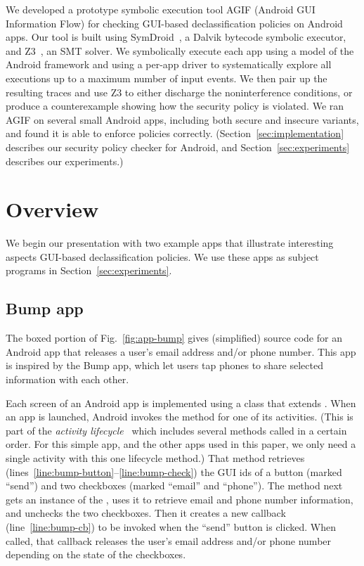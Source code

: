 \documentclass{entcs} \usepackage{entcsmacro}
\newcommand{\code}[1]{\text{\lstinline!#1!}}
\newcommand{\toolname}{AGIF\xspace}
\begin{document}
We developed a prototype symbolic execution tool \toolname{} (Android
GUI Information Flow)
for checking GUI-based declassification policies on
Android apps. Our tool is built using SymDroid~\cite{Jeon:2012}, a Dalvik
bytecode symbolic executor, and Z3~\cite{deMoura:2008}, an SMT solver. We
symbolically execute each app using a model of the Android framework
and using a per-app driver to systematically explore all executions up
to a maximum number of input events. We then pair up the resulting
traces and use Z3 to either discharge the noninterference conditions,
or produce a counterexample showing how the security policy is
violated.  
We ran \toolname{} on several small Android apps, including both
secure and insecure variants, and found it is able to enforce policies
correctly. (Section~\ref{sec:implementation} describes our security
policy checker for Android, and Section~\ref{sec:experiments}
describes our experiments.)

\section{Overview}
\label{sec:overview}

We begin our presentation with two example apps that illustrate
interesting aspects GUI-based declassification policies. We use these
apps as subject programs in Section~\ref{sec:experiments}.

\subsection{Bump app}
The boxed portion of Fig.~\ref{fig:app-bump} gives (simplified)
source code for an Android app that releases a user's email address
and/or phone number. This app is inspired by the Bump app, which
let users tap phones to share selected information with each other.

Each screen of an Android app is implemented using a class that
extends \code{Activity}. When an app is launched, Android invokes the
\code{onCreate} method for one of its activities.
(This is part of the \emph{activity lifecycle}~\cite{AndroidLifecycle}
which includes several methods called in a certain order. For this
simple app, and the other apps used in this paper, we only need a
single activity with this one lifecycle method.)
That method retrieves
(lines~\ref{line:bump-button}--\ref{line:bump-check}) the GUI ids of a
button (marked ``send'') and
two checkboxes (marked ``email'' and ``phone''). The \code{onCreate} method next
gets an instance of the \code{TelephonyManager}, uses it
to retrieve email and phone number information, and unchecks the two
checkboxes. Then it creates a new callback
(line~\ref{line:bump-cb}) to be invoked when the ``send'' button is
clicked. When called, that callback releases the user's email address and/or
phone number depending on the state of the checkboxes.
\end{document}
